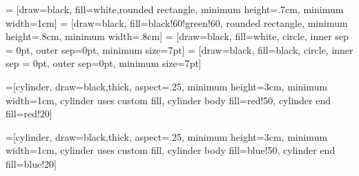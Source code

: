 \documentclass{article}
\begin{document}
\pagestyle{empty}

\begin{comment}
:Title: Channel Pair Output and log-singularity
\end{comment}

 = [draw=black, fill=white,rounded rectangle, minimum height=.7cm, minimum width=1cm]
 = [draw=black, fill=black!60!green!60, rounded rectangle, minimum height=.8cm, minimum width=.8cm]
 = [draw=black, fill=white, circle, inner sep = 0pt, outer sep=0pt, minimum size=7pt]
 = [draw=black, fill=black, circle, inner sep = 0pt, outer sep=0pt, minimum size=7pt]

=[cylinder, draw=black,thick, aspect=.25, minimum height=3cm,
                      minimum width=1cm, cylinder uses custom fill, 
                      cylinder body fill=red!50, cylinder end fill=red!20]

=[cylinder, draw=black,thick, aspect=.25, minimum height=3cm,
                      minimum width=1cm, cylinder uses custom fill, 
                      cylinder body fill=blue!50, cylinder end fill=blue!20]

\newcommand\drawArc[1]{
\draw[dashed]
let \p1 = ($ (#1.after bottom) - (#1.before bottom) $),
\n1 = {0.5*veclen(\x1,\y1)-\pgflinewidth},
\p2 = ($ (#1.bottom) - (#1.after bottom)!.5!(#1.before bottom) $),
\n2 = {veclen(\x2,\y2)-\pgflinewidth}
in
([xshift=-\pgflinewidth] #1.before bottom) arc [start angle=270, delta angle=180,
x radius=\n2, y radius=\n1]
}
\end{document}
